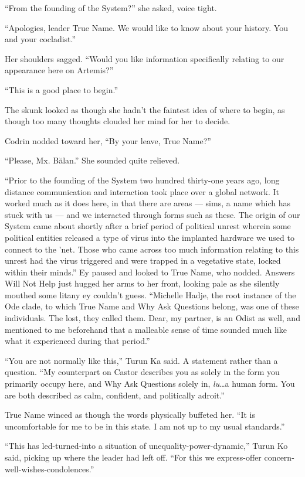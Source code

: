 ``From the founding of the System?'' she asked, voice tight.

``Apologies, leader True Name. We would like to know about your history. You and your cocladist.''

Her shoulders sagged. ``Would you like information specifically relating to our appearance here on Artemis?''

``This is a good place to begin.''

The skunk looked as though she hadn't the faintest idea of where to begin, as though too many thoughts clouded her mind for her to decide.

Codrin nodded toward her, ``By your leave, True Name?''

``Please, Mx. Bălan.'' She sounded quite relieved.

``Prior to the founding of the System two hundred thirty-one years ago, long distance communication and interaction took place over a global network. It worked much as it does here, in that there are areas — sims, a name which has stuck with us — and we interacted through forms such as these. The origin of our System came about shortly after a brief period of political unrest wherein some political entities released a type of virus into the implanted hardware we used to connect to the 'net. Those who came across too much information relating to this unrest had the virus triggered and were trapped in a vegetative state, locked within their minds.'' Ey paused and looked to True Name, who nodded. Answers Will Not Help just hugged her arms to her front, looking pale as she silently mouthed some litany ey couldn't guess. ``Michelle Hadje, the root instance of the Ode clade, to which True Name and Why Ask Questions belong, was one of these individuals. The lost, they called them. Dear, my partner, is an Odist as well, and mentioned to me beforehand that a malleable sense of time sounded much like what it experienced during that period.''

``You are not normally like this,'' Turun Ka said. A statement rather than a question. ``My counterpart on Castor describes you as solely in the form you primarily occupy here, and Why Ask Questions solely in, \emph{lu}\ldots a human form. You are both described as calm, confident, and politically adroit.''

True Name winced as though the words physically buffeted her. ``It is uncomfortable for me to be in this state. I am not up to my usual standards.''

``This has led-turned-into a situation of unequality-power-dynamic,'' Turun Ko said, picking up where the leader had left off. ``For this we express-offer concern-well-wishes-condolences.''

